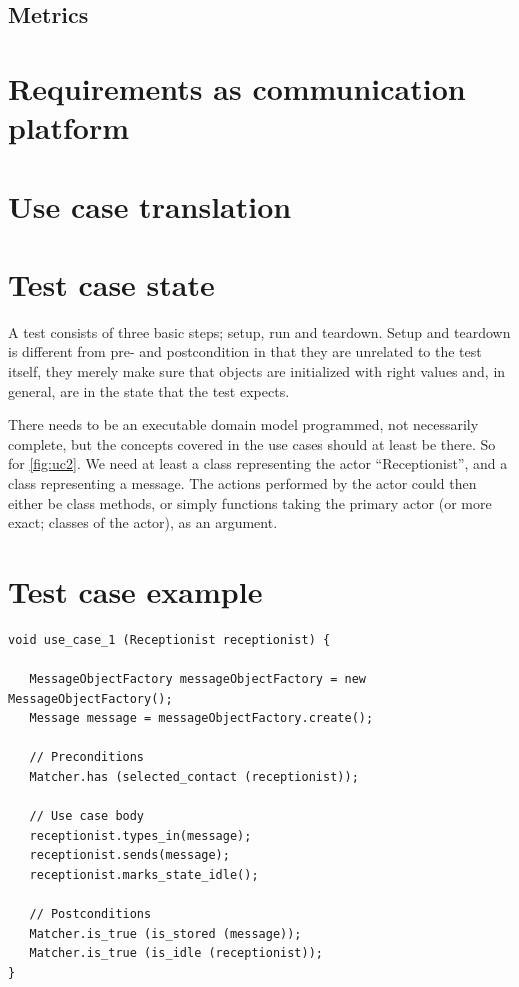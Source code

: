 \subsection{Metrics}

\section{Requirements as communication platform}

\section{Use case translation}

\section{Test case state}
A test consists of three basic steps; setup, run and teardown. Setup and teardown is different from pre- and postcondition in that they are unrelated to the test itself, they merely make sure that objects are initialized with right values and, in general, are in the state that the test expects.

There needs to be an executable domain model programmed, not necessarily complete, but the concepts covered in the use cases should at least be there. So for \ref{fig:uc2}. We need at least a class representing the actor ``Receptionist'', and a class representing a message. The actions performed by the actor could then either be class methods, or simply functions taking the primary actor (or more exact; classes of the actor), as an argument.

\label{sec:test_case_state}

\section{Test case example}
\begin{lstlisting}
void use_case_1 (Receptionist receptionist) {

   MessageObjectFactory messageObjectFactory = new MessageObjectFactory();
   Message message = messageObjectFactory.create();

   // Preconditions
   Matcher.has (selected_contact (receptionist));

   // Use case body 
   receptionist.types_in(message);
   receptionist.sends(message);
   receptionist.marks_state_idle();

   // Postconditions 
   Matcher.is_true (is_stored (message));
   Matcher.is_true (is_idle (receptionist));
}
\end{lstlisting}

